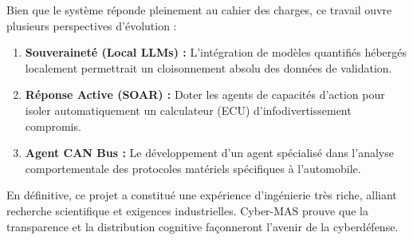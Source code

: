 \documentclass[a4paper, 12pt]{report}
\begin{document}
Bien que le système réponde pleinement au cahier des charges, ce travail ouvre plusieurs perspectives d'évolution :
\begin{enumerate}
    \item \textbf{Souveraineté (Local LLMs) :} L'intégration de modèles quantifiés hébergés localement permettrait un cloisonnement absolu des données de validation.
    \item \textbf{Réponse Active (SOAR) :} Doter les agents de capacités d'action pour isoler automatiquement un calculateur (ECU) d'infodivertissement compromis.
    \item \textbf{Agent CAN Bus :} Le développement d'un agent spécialisé dans l'analyse comportementale des protocoles matériels spécifiques à l'automobile.
\end{enumerate}

En définitive, ce projet a constitué une expérience d'ingénierie très riche, alliant recherche scientifique et exigences industrielles. Cyber-MAS prouve que la transparence et la distribution cognitive façonneront l'avenir de la cyberdéfense.
\end{document}
